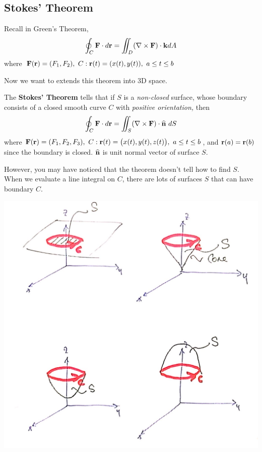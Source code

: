 \begin{spacing}{1.3}
    \newpage
    \section{Stokes’ Theorem}
    {\blue Recall in Green's Theorem, 
    $$\oint_C {\bf F}\cdot d{\bf r} =\iint_D (\nabla\times {\bf F})\cdot {\bf k} dA$$
    where $\FF(\rr)=(F_1,F_2),\ C: \rr(t)=(x(t), y(t)),\ a\le t\le b$}

    Now we want to extends this theorem into 3D space.

    The {\bf Stokes' Theorem} tells that if $S$ is a {\it non-closed} surface, 
    whose boundary consists of a closed smooth curve $C$ with {\it positive orientation,} then
    $$\oint_C {\bf F}\cdot d{\bf r} =\iint_S (\nabla\times {\bf F})\cdot \widehat{\bf n} \ dS$$
    where ${\bf F}({\bf r})=(F_1,F_2, F_3),\ C: {\bf r}(t)=\bigl(x(t), y(t), z(t)\bigr),\ a\le t\le b$,
    and ${\bf r}(a)={\bf r}(b)$ since the boundary is closed. $\widehat{\bf n}$ is unit normal vector of surface $S$.

    \vspace{0.4in}
    However, you may have noticed that the theorem doesn't tell how to find $S$. When we evaluate a 
    line integral on $C$, there are lots of surfaces $S$ that can have boundary $C$. 
    \begin{center}
        \includegraphics[scale=0.24]{images/Ch16-stoke-manysurfaces.JPG}
    \end{center}


\end{spacing}
